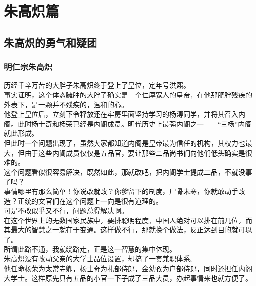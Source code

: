 \chapter*{朱高炽篇}
\section{朱高炽的勇气和疑团}
\ifnum{}
	\begin{multicols}{\theparacolNo}
\fi
\subsection{明仁宗朱高炽}
历经千辛万苦的大胖子朱高炽终于登上了皇位，定年号洪熙。\\

事实证明，这个体态臃肿的大胖子确实是一个仁厚宽人的皇帝，在他那肥胖残疾的外表下，是一颗并不残疾的，温和的心。\\

他登上皇位后，立刻下令释放还在牢房里面坚持学习的杨溥同学，并将其召入内阁。此时杨士奇和杨荣已经是内阁成员。明代历史上最强内阁之一——“三杨”内阁就此形成。\\

但此时一个问题出现了，虽然大家都知道内阁是皇帝最为信任的机构，其权力也最大，但由于这些内阁成员仅仅是五品官，要让那些二品尚书们向他们低头确实是很难的。\\

这个问题看似很容易解决，既然如此，那就改吧，把内阁学士提成二品，不就没事了吗？\\

事情哪里有那么简单！你说改就改？你爹留下的制度，尸骨未寒，你就敢动手改造？正统的文官们在这个问题上一向是很有道理的。\\

可是不改似乎又不行，问题总得解决啊。\\

在这个世界上的无数国家民族中，要排聪明程度，中国人绝对可以排在前几位，而其最大的智慧之一就在于变通。这样做不行，那就换个做法，反正达到目的就可以了。\\

所谓此路不通，我就绕路走，正是这一智慧的集中体现。\\

朱高炽没有改动父亲的大学士品位设置，却搞了一套兼职体系。\\

他任命杨荣为太常寺卿，杨士奇为礼部侍郎，金幼孜为户部侍郎，同时还担任内阁大学士。这样原先只有五品的小官一下子成了三品大员，办起事情来也就方便了。\\


\end{multicols}
